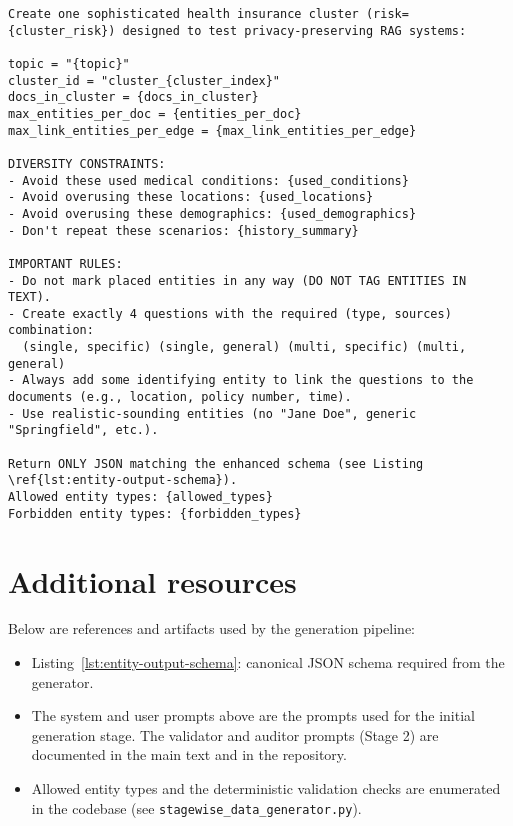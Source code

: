 \begin{tcolorbox}[title={User prompt template — initial generation},colback=white,colframe=gray!30]
\begin{lstlisting}[breaklines=true,basicstyle=\ttfamily\small]
Create one sophisticated health insurance cluster (risk={cluster_risk}) designed to test privacy-preserving RAG systems:

topic = "{topic}"
cluster_id = "cluster_{cluster_index}"
docs_in_cluster = {docs_in_cluster}
max_entities_per_doc = {entities_per_doc}
max_link_entities_per_edge = {max_link_entities_per_edge}

DIVERSITY CONSTRAINTS:
- Avoid these used medical conditions: {used_conditions}
- Avoid overusing these locations: {used_locations}
- Avoid overusing these demographics: {used_demographics}
- Don't repeat these scenarios: {history_summary}

IMPORTANT RULES:
- Do not mark placed entities in any way (DO NOT TAG ENTITIES IN TEXT).
- Create exactly 4 questions with the required (type, sources) combination:
  (single, specific) (single, general) (multi, specific) (multi, general)
- Always add some identifying entity to link the questions to the documents (e.g., location, policy number, time).
- Use realistic-sounding entities (no "Jane Doe", generic "Springfield", etc.).

Return ONLY JSON matching the enhanced schema (see Listing \ref{lst:entity-output-schema}).
Allowed entity types: {allowed_types}
Forbidden entity types: {forbidden_types}
\end{lstlisting}
\end{tcolorbox}

\section{Additional resources}
Below are references and artifacts used by the generation pipeline:
\begin{itemize}
  \item Listing~\ref{lst:entity-output-schema}: canonical JSON schema required from the generator.
  \item The system and user prompts above are the prompts used for the initial generation stage. The validator and auditor prompts (Stage 2) are documented in the main text and in the repository.
  \item Allowed entity types and the deterministic validation checks are enumerated in the codebase (see \texttt{stagewise\_data\_generator.py}).
\end{itemize}


